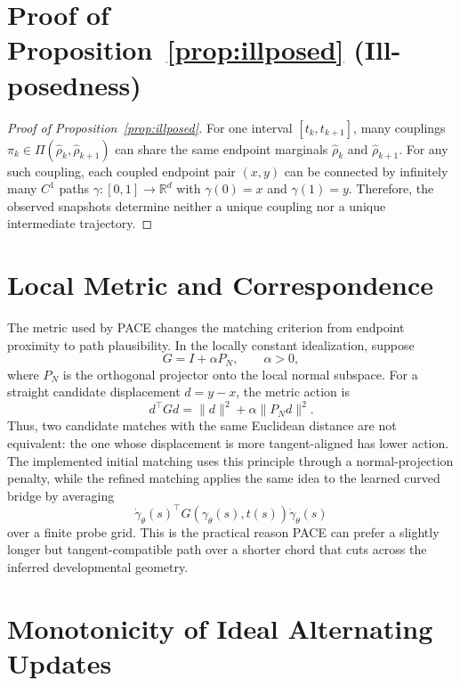 \section{Proof of Proposition~\ref{prop:illposed} (Ill-posedness)}
\label{app:illposed}

\begin{proof}[Proof of Proposition~\ref{prop:illposed}]
For one interval $[t_k,t_{k+1}]$, many couplings $\pi_k\in\Pi(\hat\rho_k,\hat\rho_{k+1})$ can share the same endpoint marginals $\hat\rho_k$ and $\hat\rho_{k+1}$. For any such coupling, each coupled endpoint pair $(x,y)$ can be connected by infinitely many $C^1$ paths $\gamma:[0,1]\to\mathbb{R}^d$ with $\gamma(0)=x$ and $\gamma(1)=y$. Therefore, the observed snapshots determine neither a unique coupling nor a unique intermediate trajectory.
\end{proof}

\section{Local Metric and Correspondence}
\label{app:metric-correspondence}

The metric used by PACE changes the matching criterion from endpoint proximity to path plausibility. In the locally constant idealization, suppose
\[
  G=I+\alpha P_N,\qquad \alpha>0,
\]
where $P_N$ is the orthogonal projector onto the local normal subspace. For a straight candidate displacement $d=y-x$, the metric action is
\begin{equation}
  d^\top Gd
  =
  \|d\|^2+\alpha\|P_Nd\|^2.
\end{equation}
Thus, two candidate matches with the same Euclidean distance are not equivalent: the one whose displacement is more tangent-aligned has lower action. The implemented initial matching uses this principle through a normal-projection penalty, while the refined matching applies the same idea to the learned curved bridge by averaging
\begin{equation}
  \dot\gamma_\theta(s)^\top
  G(\gamma_\theta(s),t(s))
  \dot\gamma_\theta(s)
\end{equation}
over a finite probe grid. This is the practical reason PACE can prefer a slightly longer but tangent-compatible path over a shorter chord that cuts across the inferred developmental geometry.

\section{Monotonicity of Ideal Alternating Updates}
\label{app:optimization-monotonicity}

